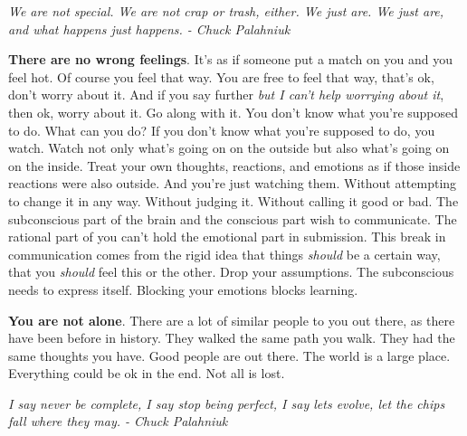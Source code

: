 \documentclass[a4paper,hidelinks]{article}
\begin{document}
\newpage

\begin{center}
\textit{
We are not special. We are not crap or trash, either. We just are. We just are, and what happens just happens. - Chuck Palahniuk
}
\end{center}

\textbf{There are no wrong feelings}.
It's as if someone put a match on you and you feel hot.
Of course you feel that way.
You are free to feel that way, that's ok, don't worry about it.
And if you say further \textit{but I can't help worrying about it}, then ok, worry about it.
Go along with it.
You don't know what you're supposed to do.
What can you do?
If you don't know what you're supposed to do, you watch.
Watch not only what's going on on the outside but also what's going on on the inside.
Treat your own thoughts, reactions, and emotions as if those inside reactions were also outside.
And you're just watching them.
Without attempting to change it in any way.
Without judging it.
Without calling it good or bad.
The subconscious part of the brain and the conscious part wish to communicate.
The rational part of you can't hold the emotional part in submission.
This break in communication comes from the rigid idea that things \textit{should} be a certain way, that you \textit{should} feel this or the other.
Drop your assumptions.
The subconscious needs to express itself.
Blocking your emotions blocks learning.

\newpage

\textbf{You are not alone}.
There are a lot of similar people to you out there, as there have been before in history.
They walked the same path you walk.
They had the same thoughts you have.
Good people are out there.
The world is a large place.
Everything could be ok in the end.
Not all is lost.

\newpage

\begin{center}
\textit{
I say never be complete, I say stop being perfect, I say lets evolve, let the chips fall where they may. - Chuck Palahniuk
}
\end{center}
\end{document}
